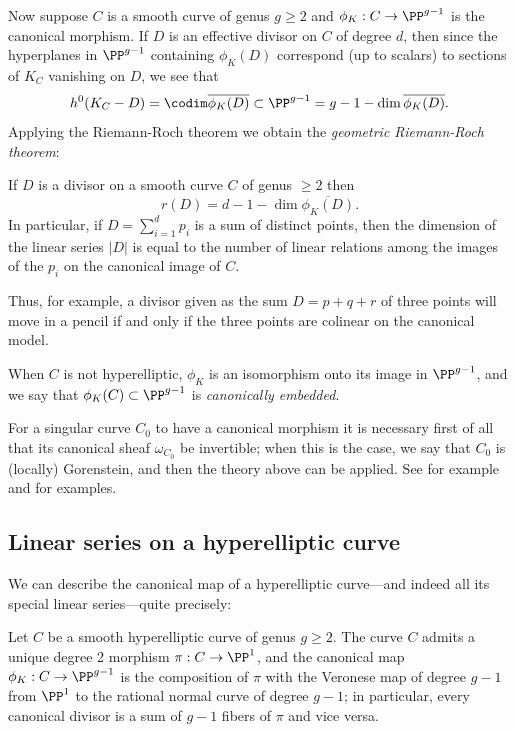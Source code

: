 Now suppose $C$ is a smooth curve of genus $g\geq 2$ and $\phi_K: C\to \PP^{g-1}$ is the canonical morphism.
If  $D$ is an effective divisor on $C$ of degree $d$, then since the hyperplanes in $\PP^{g-1}$ containing $\phi_K(D)$ correspond (up to scalars) to sections of $K_C$ vanishing on $D$, we see that
$$
h^0(K_C-D) = \codim \overline{ \phi_K(D)} \subset \PP^{g-1}= g - 1 - \dim \overline{ \phi_K(D)}.
$$
Applying the Riemann-Roch theorem we obtain  the \emph{geometric Riemann-Roch theorem}:

\begin{corollary}\label{geometric RR}
If $D$ is a divisor on a smooth curve $C$ of genus $\geq 2$ then
$$
r(D) = d - 1 - \dim \overline{ \phi_K(D)}.
$$
In particular, if $D = \sum_{i=1}^dp_i$ is a sum of distinct points, then
 the dimension of the linear series $|D|$  is equal to the number of linear relations among the images of the $p_i$ on the canonical 
 image of $C$.
\end{corollary}

Thus, for example, a divisor given as the sum $D = p+q+r$ of three points will move in a pencil if and only if the three points are colinear on the canonical model.

When $C$ is not hyperelliptic, $\phi_K$ is an isomorphism onto its image in $\PP^{g-1}$, and we say that $ \phi_K(C)\subset \PP^{g-1}$ is \emph{canonically embedded}. 

\begin{remark}
For a singular curve $C_0$ to have a canonical morphism it is necessary first of all that its canonical sheaf
 $\omega_{C_0}$ be invertible; when this is the case, we say that $C_0$ is (locally) Gorenstein, and then
the theory above can be applied. See for example \cite{graphcurves} and \cite{ribbons} for examples. 
\end{remark}

\subsection{Linear series on a hyperelliptic curve}
We can describe the canonical map of a hyperelliptic curve---and indeed all its special linear series---quite precisely:

\begin{corollary}\label{canonical on hyperelliptic}
Let $C$ be a smooth hyperelliptic curve of genus $g\geq 2$. The curve $C$ admits a unique degree 2 morphism $\pi: C\to \PP^1$,
and the canonical map $\phi_K: C\to \PP^{g-1}$ is the composition of $\pi$ with the Veronese map of degree $g-1$ from
$\PP^1$ to the rational normal curve of degree $g-1$; in particular, every canonical divisor is a sum of $g-1$ fibers of $\pi$ and vice versa.
\end{corollary}

